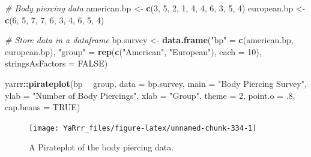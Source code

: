 \documentclass[]{book}
\newenvironment{Shaded}{\begin{snugshade}}{\end{snugshade}}
\newcommand{\KeywordTok}[1]{\textcolor[rgb]{0.13,0.29,0.53}{\textbf{#1}}}
\newcommand{\DataTypeTok}[1]{\textcolor[rgb]{0.13,0.29,0.53}{#1}}
\newcommand{\DecValTok}[1]{\textcolor[rgb]{0.00,0.00,0.81}{#1}}
\newcommand{\StringTok}[1]{\textcolor[rgb]{0.31,0.60,0.02}{#1}}
\newcommand{\CommentTok}[1]{\textcolor[rgb]{0.56,0.35,0.01}{\textit{#1}}}
\newcommand{\OtherTok}[1]{\textcolor[rgb]{0.56,0.35,0.01}{#1}}
\newcommand{\OperatorTok}[1]{\textcolor[rgb]{0.81,0.36,0.00}{\textbf{#1}}}
\newcommand{\NormalTok}[1]{#1}
\theoremstyle{definition}
\theoremstyle{definition}
\theoremstyle{remark}
\begin{document}
\begin{Shaded}
\begin{Highlighting}[]
\CommentTok{# Body piercing data}
\NormalTok{american.bp <-}\StringTok{ }\KeywordTok{c}\NormalTok{(}\DecValTok{3}\NormalTok{, }\DecValTok{5}\NormalTok{, }\DecValTok{2}\NormalTok{, }\DecValTok{1}\NormalTok{, }\DecValTok{4}\NormalTok{, }\DecValTok{4}\NormalTok{, }\DecValTok{6}\NormalTok{, }\DecValTok{3}\NormalTok{, }\DecValTok{5}\NormalTok{, }\DecValTok{4}\NormalTok{)}
\NormalTok{european.bp <-}\StringTok{ }\KeywordTok{c}\NormalTok{(}\DecValTok{6}\NormalTok{, }\DecValTok{5}\NormalTok{, }\DecValTok{7}\NormalTok{, }\DecValTok{7}\NormalTok{, }\DecValTok{6}\NormalTok{, }\DecValTok{3}\NormalTok{, }\DecValTok{4}\NormalTok{, }\DecValTok{6}\NormalTok{, }\DecValTok{5}\NormalTok{, }\DecValTok{4}\NormalTok{)}

\CommentTok{# Store data in a dataframe}
\NormalTok{bp.survey <-}\StringTok{ }\KeywordTok{data.frame}\NormalTok{(}\StringTok{"bp"}\NormalTok{ =}\StringTok{ }\KeywordTok{c}\NormalTok{(american.bp, european.bp),}
                        \StringTok{"group"}\NormalTok{ =}\StringTok{ }\KeywordTok{rep}\NormalTok{(}\KeywordTok{c}\NormalTok{(}\StringTok{"American"}\NormalTok{, }\StringTok{"European"}\NormalTok{), }\DataTypeTok{each =} \DecValTok{10}\NormalTok{),}
                         \DataTypeTok{stringsAsFactors =} \OtherTok{FALSE}\NormalTok{)}
\end{Highlighting}
\end{Shaded}

\begin{Shaded}
\begin{Highlighting}[]
\NormalTok{yarrr}\OperatorTok{::}\KeywordTok{pirateplot}\NormalTok{(bp }\OperatorTok{~}\StringTok{ }\NormalTok{group,}
                 \DataTypeTok{data =}\NormalTok{ bp.survey,}
                 \DataTypeTok{main =} \StringTok{"Body Piercing Survey"}\NormalTok{,}
                 \DataTypeTok{ylab =} \StringTok{"Number of Body Piercings"}\NormalTok{,}
                 \DataTypeTok{xlab =} \StringTok{"Group"}\NormalTok{, }
                 \DataTypeTok{theme =} \DecValTok{2}\NormalTok{, }\DataTypeTok{point.o =}\NormalTok{ .}\DecValTok{8}\NormalTok{, }\DataTypeTok{cap.beans =} \OtherTok{TRUE}\NormalTok{)}
\end{Highlighting}
\end{Shaded}

\begin{figure}

{\centering \texttt{[image: YaRrr\_files/figure-latex/unnamed-chunk-334-1]} 

}

\caption{A Pirateplot of the body piercing data.}\label{fig:unnamed-chunk-334}
\end{figure}
\end{document}
